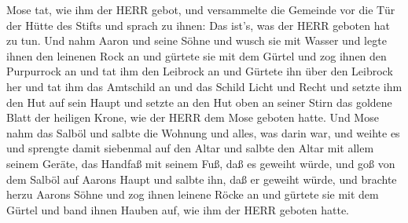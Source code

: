  Mose tat, wie ihm der HERR gebot, und versammelte die
Gemeinde vor die Tür der Hütte des Stifts  und sprach zu
ihnen: Das ist's, was der HERR geboten hat zu tun.  Und nahm
Aaron und seine Söhne und wusch sie mit Wasser  und legte
ihnen den leinenen Rock an und gürtete sie mit dem Gürtel und zog ihnen
den Purpurrock an und tat ihm den Leibrock an und Gürtete ihn über den
Leibrock her  und tat ihm das Amtschild an und das Schild
Licht und Recht  und setzte ihm den Hut auf sein Haupt und
setzte an den Hut oben an seiner Stirn das goldene Blatt der heiligen
Krone, wie der HERR dem Mose geboten hatte.  Und Mose nahm
das Salböl und salbte die Wohnung und alles, was darin war, und weihte
es  und sprengte damit siebenmal auf den Altar und salbte
den Altar mit allem seinem Geräte, das Handfaß mit seinem Fuß, daß es
geweiht würde,  und goß von dem Salböl auf Aarons Haupt und
salbte ihn, daß er geweiht würde,  und brachte herzu Aarons
Söhne und zog ihnen leinene Röcke an und gürtete sie mit dem Gürtel und
band ihnen Hauben auf, wie ihm der HERR geboten hatte.


